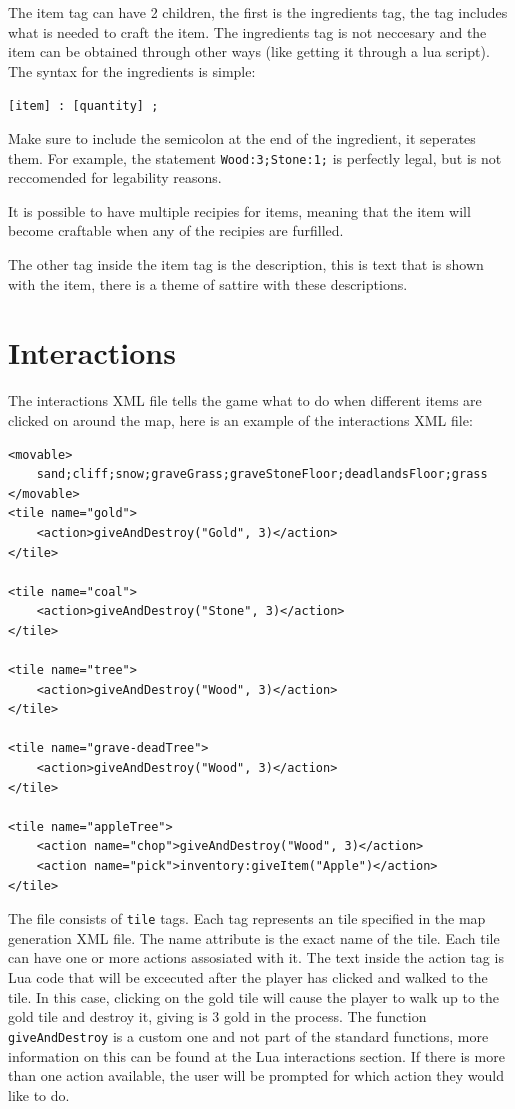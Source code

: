 \documentclass{book}
\begin{document}
The item tag can have 2 children, the first is the ingredients tag, the tag includes what is needed to craft the item. The ingredients tag is not neccesary and the item can be obtained through other ways (like getting it through a lua script). The syntax for the ingredients is simple:

\begin{center}
		\texttt{[item] : [quantity] ;}
\end{center}

Make sure to include the semicolon at the end of the ingredient, it seperates them. For example, the statement \texttt{Wood:3;Stone:1;} is perfectly legal, but is not reccomended for legability reasons.

It is possible to have multiple recipies for items, meaning that the item will become craftable when any of the recipies are furfilled.

The other tag inside the item tag is the description, this is text that is shown with the item, there is a theme of sattire with these descriptions.

\section{Interactions}
The interactions XML file tells the game what to do when different items are clicked on around the map, here is an example of the interactions XML file:

\begin{verbatim}
<movable>
	sand;cliff;snow;graveGrass;graveStoneFloor;deadlandsFloor;grass
</movable>
<tile name="gold">
	<action>giveAndDestroy("Gold", 3)</action>
</tile>

<tile name="coal">
	<action>giveAndDestroy("Stone", 3)</action>
</tile>

<tile name="tree">
	<action>giveAndDestroy("Wood", 3)</action>
</tile>

<tile name="grave-deadTree">
	<action>giveAndDestroy("Wood", 3)</action>
</tile>

<tile name="appleTree">
	<action name="chop">giveAndDestroy("Wood", 3)</action>
	<action name="pick">inventory:giveItem("Apple")</action>
</tile>
\end{verbatim}

The file consists of \texttt{tile} tags. Each tag represents an tile specified in the map generation XML file. The name attribute is the exact name of the tile. Each tile can have one or more actions assosiated with it. The text inside the action tag is Lua code that will be excecuted after the player has clicked and walked to the tile. In this case, clicking on the gold tile will cause the player to walk up to the gold tile and destroy it, giving is 3 gold in the process. The function \texttt{giveAndDestroy} is a custom one and not part of the standard functions, more information on this can be found at the Lua interactions section. If there is more than one action available, the user will be prompted for which action they would like to do.
\end{document}
